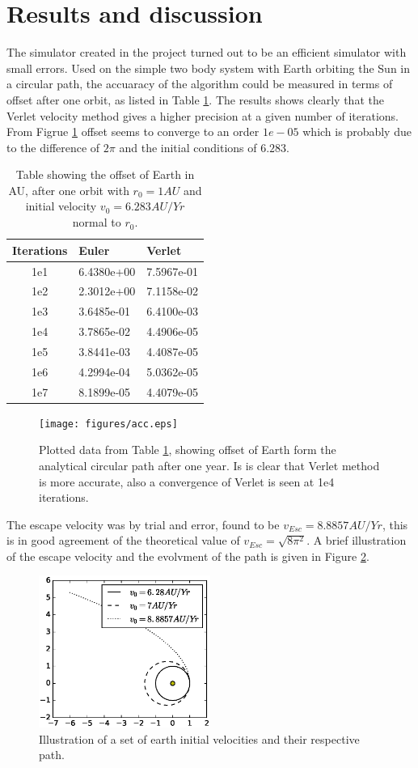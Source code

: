 \documentclass[twoside,twocolumn]{article}
\begin{document}
\section{Results and discussion}
\label{sec:results}
The simulator created in the project turned out to be an efficient simulator with small errors. Used on the simple two body system with Earth orbiting the Sun in a circular path, the accuaracy of the algorithm could be measured in terms of offset after one orbit, as listed in Table \ref{tbl:convergence}. The results shows clearly that the Verlet velocity method gives a higher precision at a given number of iterations. From Figrue \ref{fig:acc} offset seems to converge to an order $1e-05$ which is probably due to the difference of $2\pi$ and the initial conditions of $6.283$. 
\begin{table}[h]
\caption{Table showing the offset of Earth in AU, after one orbit with $r_0=1AU$ and initial velocity $v_0=6.283 AU/Yr$ normal to $r_0$. }\label{tbl:convergence}
\centering
\begin{tabular}{|c|l|l|}\hline
Iterations & Euler & Verlet\\ \hline
1e1 & 6.4380e+00 & 7.5967e-01\\
1e2 & 2.3012e+00 & 7.1158e-02\\
1e3 & 3.6485e-01 & 6.4100e-03\\
1e4 & 3.7865e-02 & 4.4906e-05\\
1e5 & 3.8441e-03 & 4.4087e-05\\
1e6 & 4.2994e-04 & 5.0362e-05\\
1e7 & 8.1899e-05 & 4.4079e-05\\ \hline
\end{tabular}
\end{table}
\begin{figure}[h]
\texttt{[image: figures/acc.eps]} 
		\caption{Plotted data from Table \ref{tbl:convergence}, showing offset of Earth form the analytical circular path after one year. Is is clear that Verlet method is more accurate, also a convergence of Verlet is seen at 1e4 iterations.}\label{fig:acc}
\end{figure}
The escape velocity was by trial and error, found to be $v_{Esc}=8.8857 AU/Yr$, this is in good agreement of the theoretical value of $v_{Esc}=\sqrt{8\pi^2}$. A brief illustration of the escape velocity and the evolvment of the path is given in Figure \ref{fig:earth_vel}.
\begin{figure}[t]
\includegraphics[width=0.5\textwidth]{figures/earthEsc.eps} 
		\caption{Illustration of a set of earth initial velocities and their respective path.}\label{fig:earth_vel}
\end{figure}
\end{document}
